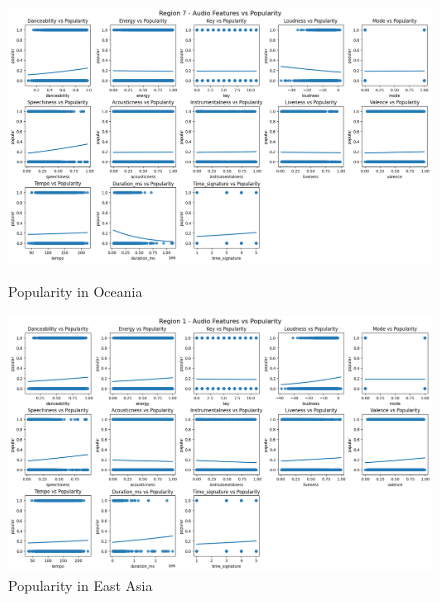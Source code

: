 \begin{figure}[h]
    \centering
    \begin{minipage}{0.45\textwidth}
        \centering
        \includegraphics[width=\linewidth]{media/region7_cleaned.png}
        \caption{Popularity in Oceania}
        \label{oceania}
    \end{minipage}%
    \hspace{0.05\textwidth}
    \begin{minipage}{0.45\textwidth}
        \centering
        \includegraphics[width=\linewidth]{media/region1_cleaned.png}
        \caption{Popularity in East Asia}
        \label{east_asia}
    \end{minipage}
    
    \vspace{0.05\textwidth}
    

\end{figure}
